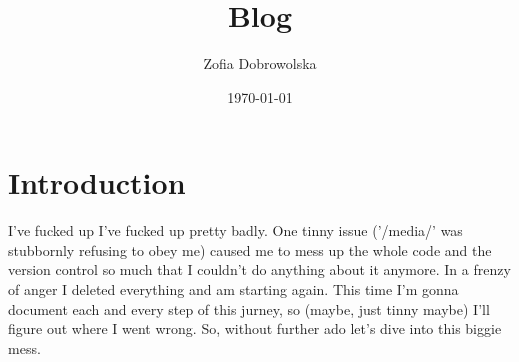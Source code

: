 \documentclass[12pt,a4paper]{article}
\begin{document}
\title{Blog}

\author{Zofia Dobrowolska}

\date{\today}

\maketitle
\section{Introduction}
I've fucked up
 I've fucked up pretty badly.
One tinny issue ('/media/' was stubbornly refusing to obey me) caused me to mess up the whole code and the version control so much that I couldn't do anything about it anymore.
In a frenzy of anger I deleted everything and am starting again.
This time I'm gonna document each and every step of this jurney, so (maybe, just tinny maybe) I'll figure out where I went wrong.
So, without further ado let's dive into this biggie mess.
\end{document}
